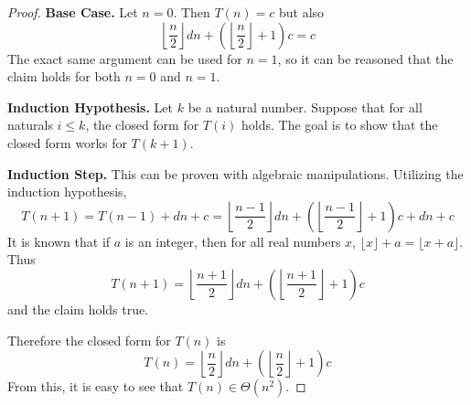\documentclass[11pt]{article}
\begin{document}
\begin{enumerate}
\begin{proof}
            \textbf{Base Case.} Let \(n=0\). Then \(T(n) = c\) but also
            \[
                \left\lfloor \frac{n}{2} \right\rfloor dn + \left( \left\lfloor \frac{n}{2} \right\rfloor + 1 \right) c = c
            \]
            The exact same argument can be used for \(n=1\), so it can be reasoned that the claim holds for both \(n=0\) and \(n=1\).

            \textbf{Induction Hypothesis.} Let \(k\) be a natural number. Suppose that for all naturals \(i \leq k\), the closed form for \(T(i)\) holds. The goal is to show that the closed form works for \(T(k+1)\).

            \textbf{Induction Step.} This can be proven with algebraic manipulations. Utilizing the induction hypothesis,
            \[
                T(n+1) = T(n-1) + dn + c = \left\lfloor \frac{n-1}{2} \right\rfloor dn + \left( \left\lfloor \frac{n-1}{2} \right\rfloor + 1 \right) c + dn + c
            \]
            It is known that if \(a\) is an integer, then for all real numbers \(x\), \(\lfloor x \rfloor + a = \lfloor x+a \rfloor\). Thus
            \[
                T(n+1) = \left\lfloor \frac{n+1}{2} \right\rfloor dn + \left( \left\lfloor \frac{n+1}{2} \right\rfloor + 1 \right) c
            \]
            and the claim holds true.

            Therefore the closed form for \(T(n)\) is
            \[
                T(n)=\left\lfloor \frac{n}{2} \right\rfloor dn + \left( \left\lfloor \frac{n}{2} \right\rfloor + 1 \right) c
            \]
            From this, it is easy to see that \(T(n) \in \Theta(n^2)\).

        \end{proof}
    \end{enumerate}
\end{document}
